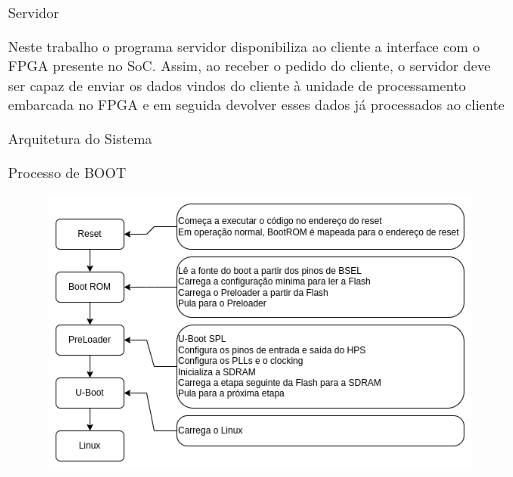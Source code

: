 \documentclass[10pt]{beamer}
\begin{document}

\begin{frame}{Servidor}
	\begin{alertblock}{}
		\vspace{0.2cm}
	    \begin{justify}
			Neste trabalho o programa servidor disponibiliza ao cliente a interface com o FPGA presente no SoC. Assim, ao receber o pedido do cliente, o servidor deve ser capaz de enviar os dados vindos do cliente à unidade de processamento embarcada no FPGA e em seguida devolver esses dados já processados ao cliente
	    \end{justify}
	\end{alertblock}
\end{frame}

\begin{frame}{Arquitetura do Sistema}
    \begin{alertblock}{Processo de BOOT}
		\vspace{0.2cm}
		\begin{figure}[h]
			\begin{center}
				\includegraphics[scale=0.45]{imagens/embeddedLinux.png}\\
			\end{center}
			\label{fig:boot}
		\end{figure}
	\end{alertblock}
\end{frame}
\end{document}
